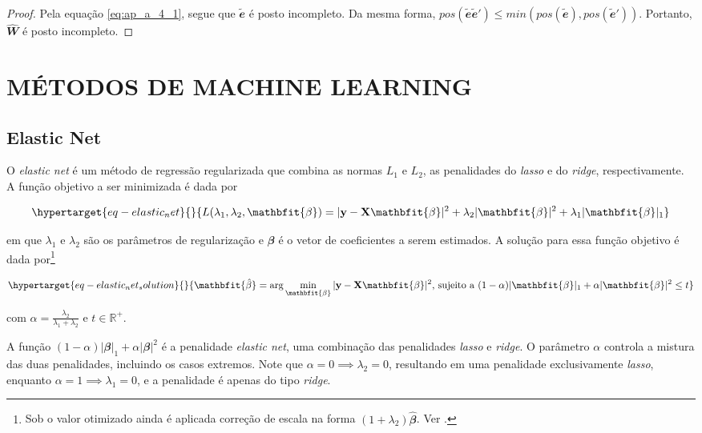 \begin{apendicesenv}
\begin{proof}
  Pela equação \eqref{eq:ap_a_4_1}, segue que $\mathbfit{\tilde{e}}$ é posto incompleto. Da mesma forma, $pos(\mathbfit{\tilde{e}\tilde{e}'}) \leq min(pos(\mathbfit{\tilde{e}}), pos(\mathbfit{\tilde{e}'}))$. Portanto, $\mathbfit{\hat{W}}$ é posto incompleto.
\end{proof}

\chapter{MÉTODOS DE MACHINE LEARNING} \label{apendice_metodos_ml}

\section{Elastic Net}\label{elastic-net}

O \emph{elastic net} \autocite{zou_regularization_2005} é um método de
regressão regularizada que combina as normas \(L_1\) e \(L_2\), as
penalidades do \emph{lasso} e do \emph{ridge}, respectivamente. A função
objetivo a ser minimizada é dada por

\begin{equation}\protect\hypertarget{eq-elastic_net}{}{
L(\lambda_1, \lambda_2, \mathbfit{\beta}) = |\mathbf{y} - \mathbf{X}\mathbfit{\beta}|^2 + \lambda_2|\mathbfit{\beta}|^2 + \lambda_1|\mathbfit{\beta}|_1
}\label{eq-elastic_net}\end{equation}

\noindent em que \(\lambda_1\) e \(\lambda_2\) são os parâmetros de
regularização e \(\mathbfit{\beta}\) é o vetor de coeficientes a serem
estimados. A solução para essa função objetivo é dada por\footnote{Sob o
  valor otimizado ainda é aplicada correção de escala na forma
  \((1+\lambda_2)\mathbfit{\hat{\beta}}\). Ver
  \textcite{zou_regularization_2005}.}

\begin{equation}\protect\hypertarget{eq-elastic_net_solution}{}{
\mathbfit{\hat{\beta}} = \arg \min_{\mathbfit{\beta}} |\mathbf{y}-\mathbf{X}\mathbfit{\beta}|^2 \text{, sujeito a } (1-\alpha)|\mathbfit{\beta}|_1 + \alpha|\mathbfit{\beta}|^2 \leq t
}\label{eq-elastic_net_solution}\end{equation}

\noindent com \(\alpha = \frac{\lambda_2}{\lambda_1 + \lambda_2}\) e
\(t \in \mathbb{R}^+\).

A função \((1-\alpha)|\mathbfit{\beta}|_1 + \alpha|\mathbfit{\beta}|^2\)
é a penalidade \emph{elastic net}, uma combinação das penalidades
\emph{lasso} e \emph{ridge}. O parâmetro \(\alpha\) controla a mistura
das duas penalidades, incluindo os casos extremos. Note que
\(\alpha = 0 \implies \lambda_2 = 0\), resultando em uma penalidade
exclusivamente \emph{lasso}, enquanto
\(\alpha = 1 \implies \lambda_1 = 0\), e a penalidade é apenas do tipo
\emph{ridge}.


\end{apendicesenv}
